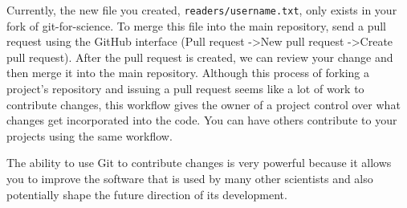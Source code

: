 Currently, the new file you created, \verb|readers/username.txt|, only exists in your fork of git-for-science.
To merge this file into the main repository, send a pull request using the GitHub interface (Pull request -\textgreater New pull request -\textgreater Create pull request).
After the pull request is created, we can review your change and then merge it into the main repository.
Although this process of forking a project’s repository and issuing a pull request seems like a lot of work to contribute changes, this workflow gives the owner of a project control over what changes get incorporated into the code.
You can have others contribute to your projects using the same workflow.

The ability to use Git to contribute changes is very powerful because it allows you to improve the software that is used by many other scientists and also potentially shape the future direction of its development.

